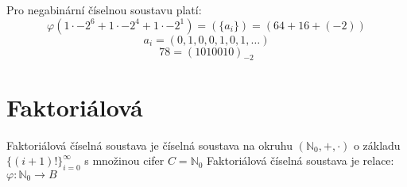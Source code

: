 \documentclass[czech,bachelor,dept470,male]{diploma}
\begin{document}
\begin{example}
	Pro negabinární číselnou soustavu platí:
	$$\varphi(1\cdot-2^6+1\cdot-2^4+1\cdot-2^1)=(\{a_i\})=(64+16+(-2))$$
	$${a_i}=(0,1,0,0,1,0,1,\dots) $$
	$$78 =(1010010)_{-2}$$
\end{example}




\section{Faktoriálová}

\begin{definition}
	Faktoriálová číselná soustava je číselná soustava na okruhu $(\mathbb{N}_0,+,\cdot)$ o základu $\{(i+1)!\}_{i=0}^\infty$ s množinou cifer $C=\mathbb{N}_0$\newline
	\newline
	Faktoriálová číselná soustava je relace:
	$\varphi:\mathbb{N}_0\to B$
\end{definition}
\end{document}
